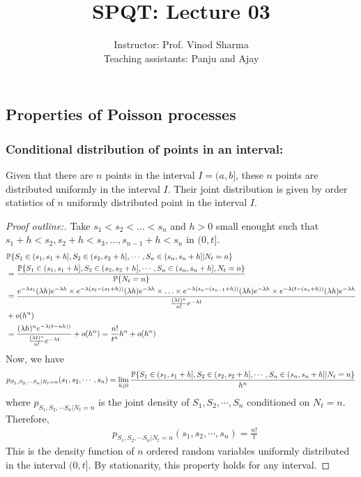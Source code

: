 \documentclass[all-lectures.tex]{subfiles}
\title{SPQT: Lecture 03}
\author{Instructor: Prof. Vinod Sharma \\ Teaching assistants: Panju and Ajay}
\begin{document}
%
\setcounter{chapter}{1}
\setcounter{section}{2}

\section*{}
\setcounter{subsection}{1}
\subsection{Properties of Poisson processes}
\subsubsection*{Conditional distribution of points in an interval:} 
\begin{thm}
Given that there are $n$ points in the interval $I = (a,b]$, these $n$ points are distributed uniformly in the interval $I$. Their joint distribution is given by order statistics of $n$ uniformly distributed point in the interval $I$.
\end{thm}
\begin{proof}[Proof outline:]
{Take $s_1 < s_2 < \dots<s_n$ and $h>0$ small enought such that $s_1+h < s_2, s_2+h < s_3, \dots, s_{n-1}+h < s_n$ in $(0,t]$.
\begin{align*}
&\P\{S_1\in (s_1,s_1+h],S_2\in (s_2,s_2+h],\cdots,S_n\in (s_n,s_n+h] |N_t = n\}  \\
&= \frac{\P\{S_1\in (s_1,s_1+h],S_2\in (s_2,s_2+h],\cdots,S_n\in (s_n,s_n+h],N_t=n\}}{\P\{N_t=n\}}  \\
 &= \frac{ e^{-\lambda s_1} (\lambda h)e^{-\lambda h} \times e^{-\lambda (s_2-(s_1+h))}(\lambda h)e^{-\lambda h} \times \ldots \times e^{-\lambda (s_n-(s_{n-1}+h))} (\lambda h) e^{-\lambda h} \times e^{-\lambda (t-(s_n+h))} (\lambda h)  e^{-\lambda h} }{ \frac{(\lambda t)^n }{n!} e^{-\lambda t} } \\ &+ o(h^n)\\
 &= \frac{ (\lambda h)^n e^{-\lambda(t-nh))}}{ \frac{(\lambda t)^n }{n!} e^{-\lambda t} } + o(h^n) = \frac{n!}{t^n} h^n + o(h^n)
\end{align*}
Now, we have 
\begin{align*}
p_{S_1,S_2,\cdots S_n | N_t=n}(s_1,s_2,\cdots,s_n) &= \lim_{h \downarrow 0} \frac{\P\{S_1\in (s_1,s_1+h],S_2\in (s_2,s_2+h],\cdots,S_n\in (s_n,s_n+h] |N_t = n\}}{h^n} \\
\end{align*}
where $p_{S_1,S_2,\cdots S_n | N_t=n}$ is the joint density of $S_1,S_2,\cdots,S_n$ conditioned on $N_t=n$. Therefore, 
\begin{align*}
&p_{S_1,S_2,\cdots S_n | N_t=n}(s_1,s_2,\cdots,s_n) = \frac{n!}{t}
\end{align*}
}
This is the density function of $n$ ordered random variables uniformly distributed in the interval $(0,t]$. By stationarity, this property holds for any interval. \qedhere
\end{proof}
\end{document}
